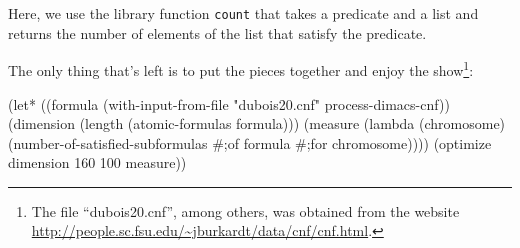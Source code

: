Here, we use the library function \texttt{count} that takes
a predicate and a list and returns the number of elements
of the list that satisfy the predicate.

The only thing that's left is to put the pieces together
and enjoy the show\footnote{The file ``dubois20.cnf'',
among others, was obtained from the website
\url{http://people.sc.fsu.edu/~jburkardt/data/cnf/cnf.html}.}:

\begin{Snippet}
(let* ((formula (with-input-from-file "dubois20.cnf" 
                  process-dimacs-cnf))
       (dimension (length (atomic-formulas formula)))
       (measure (lambda (chromosome)
                  (number-of-satisfied-subformulas #;of formula
                                               #;for chromosome))))
  (optimize dimension 160 100 measure))
\end{Snippet}
